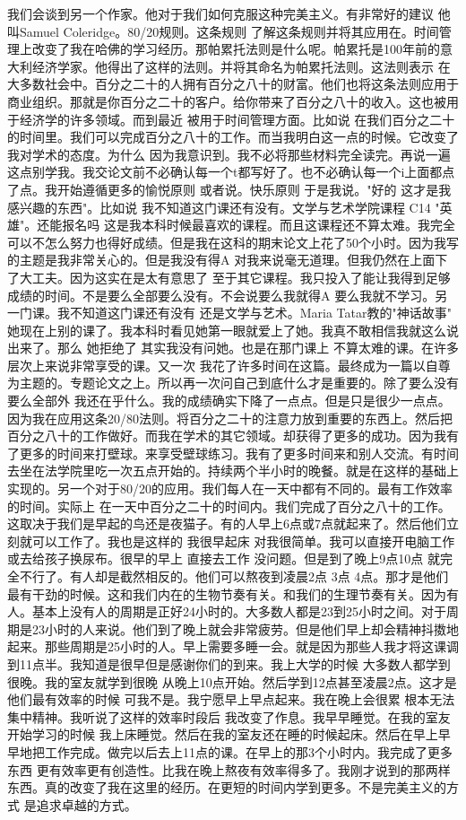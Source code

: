 我们会谈到另一个作家。他对于我们如何克服这种完美主义。有非常好的建议 他叫Samuel Coleridge。80/20规则。这条规则 了解这条规则并将其应用在。时间管理上改变了我在哈佛的学习经历。那帕累托法则是什么呢。帕累托是100年前的意大利经济学家。他得出了这样的法则。并将其命名为帕累托法则。这法则表示 在大多数社会中。百分之二十的人拥有百分之八十的财富。他们也将这条法则应用于商业组织。那就是你百分之二十的客户。给你带来了百分之八十的收入。这也被用于经济学的许多领域。而到最近 被用于时间管理方面。比如说 在我们百分之二十的时间里。我们可以完成百分之八十的工作。而当我明白这一点的时候。它改变了我对学术的态度。为什么 因为我意识到。我不必将那些材料完全读完。再说一遍 这点别学我。我交论文前不必确认每一个t都写好了。也不必确认每一个i上面都点了点。我开始遵循更多的愉悦原则 或者说。快乐原则 于是我说。"好的 这才是我感兴趣的东西"。比如说 我不知道这门课还有没有。文学与艺术学院课程 C14 "英雄"。还能报名吗 这是我本科时候最喜欢的课程。而且这课程还不算太难。我完全可以不怎么努力也得好成绩。但是我在这科的期末论文上花了50个小时。因为我写的主题是我非常关心的。但是我没有得A 对我来说毫无道理。但我仍然在上面下了大工夫。因为这实在是太有意思了 至于其它课程。我只投入了能让我得到足够成绩的时间。不是要么全部要么没有。不会说要么我就得A 要么我就不学习。另一门课。我不知道这门课还有没有 还是文学与艺术。Maria Tatar教的"神话故事" 她现在上别的课了。我本科时看见她第一眼就爱上了她。我真不敢相信我就这么说出来了。那么 她拒绝了 其实我没有问她。也是在那门课上 不算太难的课。在许多层次上来说非常享受的课。又一次 我花了许多时间在这篇。最终成为一篇以自尊为主题的。专题论文之上。所以再一次问自己到底什么才是重要的。除了要么没有要么全部外 我还在乎什么。我的成绩确实下降了一点点。但是只是很少一点点。因为我在应用这条20/80法则。将百分之二十的注意力放到重要的东西上。然后把百分之八十的工作做好。而我在学术的其它领域。却获得了更多的成功。因为我有了更多的时间来打壁球。来享受壁球练习。我有了更多时间来和别人交流。有时间去坐在法学院里吃一次五点开始的。持续两个半小时的晚餐。就是在这样的基础上实现的。另一个对于80/20的应用。我们每人在一天中都有不同的。最有工作效率的时间。实际上 在一天中百分之二十的时间内。我们完成了百分之八十的工作。这取决于我们是早起的鸟还是夜猫子。有的人早上6点或7点就起来了。然后他们立刻就可以工作了。我也是这样的 我很早起床 对我很简单。我可以直接开电脑工作或去给孩子换尿布。很早的早上 直接去工作 没问题。但是到了晚上9点10点 就完全不行了。有人却是截然相反的。他们可以熬夜到凌晨2点 3点 4点。那才是他们最有干劲的时候。这和我们内在的生物节奏有关。和我们的生理节奏有关。因为有人。基本上没有人的周期是正好24小时的。大多数人都是23到25小时之间。对于周期是23小时的人来说。他们到了晚上就会非常疲劳。但是他们早上却会精神抖擞地起来。那些周期是25小时的人。早上需要多睡一会。就是因为那些人我才将这课调到11点半。我知道是很早但是感谢你们的到来。我上大学的时候 大多数人都学到很晚。我的室友就学到很晚 从晚上10点开始。然后学到12点甚至凌晨2点。这才是他们最有效率的时候 可我不是。我宁愿早上早点起来。我在晚上会很累 根本无法集中精神。我听说了这样的效率时段后 我改变了作息。我早早睡觉。在我的室友开始学习的时候 我上床睡觉。然后在我的室友还在睡的时候起床。然后在早上早早地把工作完成。做完以后去上11点的课。在早上的那3个小时内。我完成了更多东西 更有效率更有创造性。比我在晚上熬夜有效率得多了。我刚才说到的那两样东西。真的改变了我在这里的经历。在更短的时间内学到更多。不是完美主义的方式 是追求卓越的方式。 

